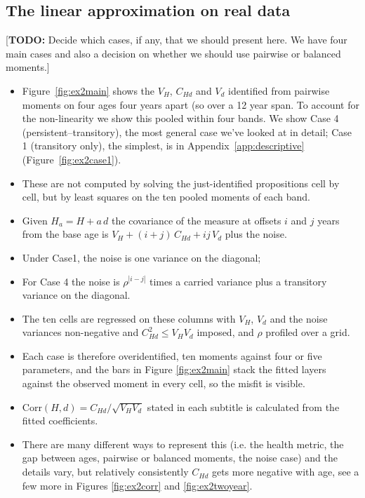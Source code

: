 \documentclass[11pt]{article}
\newcommand{\Corr}{\mathrm{Corr}}
\newcommand{\todo}[1]{\textcolor{red!75!black}{[\textbf{TODO:} #1]}}
\begin{document}
	\subsection{The linear approximation on real data} \label{subsec:lin_ident}
	
	\todo{Decide which cases, if any, that we should present here. We have four main cases and also a decision on whether we should use pairwise or balanced moments.}
	
	\begin{itemize}
		\item Figure~\ref{fig:ex2main} shows the $V_H$, $C_{Hd}$ and $V_d$ identified from pairwise moments on four ages four years apart (so over a 12 year span. To account for the non-linearity we show this pooled within four bands. We show Case 4 (persistent--transitory), the most general case we've looked at in detail; Case 1 (transitory only), the simplest, is in Appendix~\ref{app:descriptive} (Figure~\ref{fig:ex2case1}). 
		\item These are not computed by solving the just-identified propositions cell by cell, but by least squares on the ten pooled moments of each band. 
		\item Given $H_a = H + a\,d$ the covariance of the measure at offsets $i$ and $j$ years from the base age is $V_H + (i+j)\,C_{Hd} + ij\,V_d$ plus the noise. 
		\item Under Case1, the noise is one variance on the diagonal; 
		\item For Case 4 the noise is $\rho^{|i-j|}$ times a carried variance plus a transitory variance on the diagonal. 
		\item The ten cells are regressed on these columns with $V_H$, $V_d$ and the noise variances non-negative and $C_{Hd}^2 \le V_H V_d$ imposed, and $\rho$ profiled over a grid.
		\item Each case is therefore overidentified, ten moments against four or five parameters, and the bars in Figure \ref{fig:ex2main} stack the fitted layers against the observed moment in every cell, so the misfit is visible. 
		\item $\Corr(H,d) = C_{Hd}/\sqrt{V_H V_d}$ stated in each subtitle is calculated from the fitted coefficients.
		\item There are many different ways to represent this (i.e. the health metric, the gap between ages, pairwise or balanced moments, the noise case) and the details vary, but relatively consistently $C_{Hd}$ gets more negative with age, see a few more in Figures \ref{fig:ex2corr} and \ref{fig:ex2twoyear}. 

\end{itemize}
\end{document}
